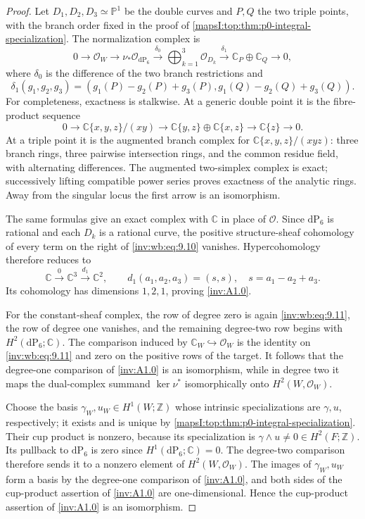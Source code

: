 \begin{proof}
Let \(D_1,D_2,D_3\simeq\mathbb P^1\) be the double curves and \(P,Q\) the
two triple points, with the branch order fixed in the proof of
\cref{mapsI:top:thm:p0-integral-specialization}.  The normalization complex is
\[
0\longrightarrow\mathcal O_W\longrightarrow
 \nu_*\mathcal O_{\mathrm{dP}_6}\xrightarrow{\delta_0}
 \bigoplus_{k=1}^3\mathcal O_{D_k}\xrightarrow{\delta_1}
 \mathbb C_P\oplus\mathbb C_Q\longrightarrow0,
\tag{WBA.9.10}\label{inv:wb:eq:9.10}
\]
where \(\delta_0\) is the difference of the two branch restrictions and
\[
 \delta_1(g_1,g_2,g_3)
 =(g_1(P)-g_2(P)+g_3(P),
   g_1(Q)-g_2(Q)+g_3(Q)).
\]
For completeness, exactness is stalkwise.  At a generic double point it is
the fibre-product sequence
\[
0\to\mathbb C\{x,y,z\}/(xy)
 \to\mathbb C\{y,z\}\oplus\mathbb C\{x,z\}
 \to\mathbb C\{z\}\to0.
\]
At a triple point it is the augmented branch complex for
\(\mathbb C\{x,y,z\}/(xyz)\): three branch rings, three pairwise
intersection rings, and the common residue field, with alternating
differences.  The augmented two-simplex complex is exact; successively
lifting compatible power series proves exactness of the analytic rings.
Away from the singular locus the first arrow is an isomorphism.

The same formulas give an exact complex with \(\mathbb C\) in place of
\(\mathcal O\).  Since \(\mathrm{dP}_6\) is rational and each \(D_k\) is a
rational curve, the positive structure-sheaf cohomology of every term on
the right of \eqref{inv:wb:eq:9.10} vanishes.  Hypercohomology therefore reduces to
\[
 \mathbb C\xrightarrow{0}\mathbb C^3
 \xrightarrow{d_1}\mathbb C^2,
 \qquad
 d_1(a_1,a_2,a_3)=(s,s),\quad s=a_1-a_2+a_3.
\tag{WBA.9.11}\label{inv:wb:eq:9.11}
\]
Its cohomology has dimensions \(1,2,1\), proving \cref{inv:A1.0}.

For the constant-sheaf complex, the row of degree zero is again \eqref{inv:wb:eq:9.11},
the row of degree one vanishes, and the remaining degree-two row begins
with \(H^2(\mathrm{dP}_6;\mathbb C)\).  The comparison induced by
\(\mathbb C_W\hookrightarrow\mathcal O_W\) is the identity on \eqref{inv:wb:eq:9.11} and
zero on the positive rows of the target.  It follows that the degree-one comparison of \cref{inv:A1.0} is an
isomorphism, while in degree two it maps the dual-complex summand
\(\ker\nu^*\) isomorphically onto \(H^2(W,\mathcal O_W)\).

Choose the basis \(\gamma_W,u_W\in H^1(W;\mathbb Z)\) whose intrinsic
specializations are \(\gamma,u\), respectively; it exists and is unique by
\cref{mapsI:top:thm:p0-integral-specialization}.  Their cup product is nonzero,
because its specialization is
\(\gamma\wedge u\ne0\in H^2(F;\mathbb Z)\).  Its pullback to
\(\mathrm{dP}_6\) is zero since
\(H^1(\mathrm{dP}_6;\mathbb C)=0\).  The degree-two comparison therefore
sends it to a nonzero element of \(H^2(W,\mathcal O_W)\).  The images of
\(\gamma_W,u_W\) form a basis by the degree-one comparison of \cref{inv:A1.0}, and both sides of the cup-product assertion of \cref{inv:A1.0} are
one-dimensional.  Hence the cup-product assertion of \cref{inv:A1.0} is an isomorphism.
\end{proof}

